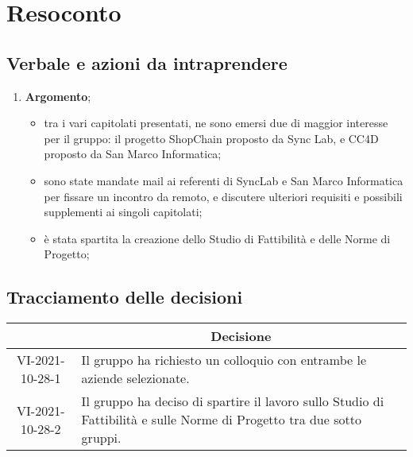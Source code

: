 \section{Resoconto}
\subsection{Verbale e azioni da intraprendere}

\begin{enumerate}
	\item \textbf{Argomento};
	\begin{itemize}
		\item tra i vari capitolati presentati, ne sono emersi due di maggior interesse per il gruppo: il progetto ShopChain proposto da Sync Lab, e CC4D proposto da San Marco Informatica;
		\item sono state mandate mail ai referenti di SyncLab e San Marco Informatica per fissare un incontro da remoto, e discutere ulteriori requisiti e possibili supplementi ai singoli capitolati;
		\item è stata spartita la creazione dello Studio di Fattibilità e delle Norme di Progetto;
	\end{itemize}
\end{enumerate}

\pagebreak

\subsection{Tracciamento delle decisioni}

\begin{table}[H]
	\centering
	\renewcommand{\arraystretch}{1.8}
	\begin{tabular}{c | p{8cm}}
		\rowcolor[HTML]{125e28}
		\multicolumn{1}{c}{\color[HTML]{FFFFFF} \textbf{ID}} &
		\multicolumn{1}{c}{\color[HTML]{FFFFFF} \textbf{Decisione}}\\
		\hline
		VI-2021-10-28-1 & Il gruppo ha richiesto un colloquio con entrambe le aziende selezionate.  \\ \hline
		VI-2021-10-28-2 & Il gruppo ha deciso di spartire il lavoro sullo Studio di Fattibilità e sulle Norme di Progetto tra due sotto gruppi. \\ 
	\end{tabular}
\end{table}